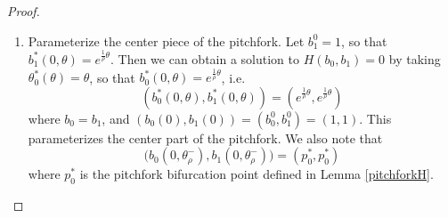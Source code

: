 \documentclass[thesis.tex]{subfiles}
\begin{document}
\begin{lemma}
\begin{proof}
\begin{enumerate}
\item Parameterize the center piece of the pitchfork. Let $b_1^0 = 1$, so that $b_1^*(0, \theta) = e^{ \frac{1}{\rho}\theta}$. Then we can obtain a solution to $H(b_0, b_1) = 0$ by taking $\theta_0^*(\theta) = \theta$, so that $b_0^*(0, \theta) = e^{ \frac{1}{\rho}\theta}$, i.e. 
\[
( b_0^*(0, \theta), b_1^*(0, \theta) ) = ( e^{ \frac{1}{\rho}\theta }, e^{ \frac{1}{\rho}\theta })
\]
where $b_0 = b_1$, and $(b_0(0), b_1(0)) = (b_0^0, b_1^0) = (1,1)$. This parameterizes the center part of the pitchfork. We also note that
\begin{equation}\label{centerpitchforkparam}
\Big(b_0(0, \theta_\rho^-), b_1(0, \theta_\rho^-)\Big) = (p_0^*, p_0^*)
\end{equation}
where $p_0^*$ is the pitchfork bifurcation point defined in Lemma \ref{pitchforkH}.


\end{enumerate}
\end{proof}
\end{lemma}
\end{document}
